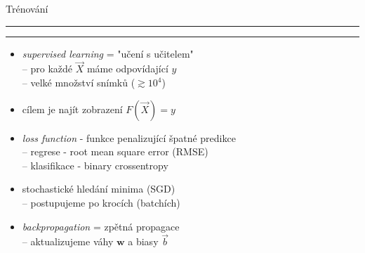 \documentclass[aspectratio=43]{beamer}
\def\vs{\vspace{-2mm}}
\def\lend{\phantom{g}\vspace{1.5mm}\hrule\hrule}
\begin{document}
\begin{frame}{\vs Trénování \lend}
\vspace{1mm}
\begin{itemize}
    \small
    \item<1-4> \textit{supervised learning} = "učení s učitelem"\\ \vspace{1.8mm}
        -- pro každé $\vec{X}$ máme odpovídající $y$\\ \vspace{1.8mm}
        -- velké množství snímků ($\gtrsim 10^4$)\\ \vspace{3.5mm}
    \item<3-4> cílem je najít zobrazení $F(\vec{X}) = y$\\ \vspace{3.5mm}
    \item<4-4> \textit{loss function} - funkce penalizující špatné predikce \\ \vspace{1.8mm}
        -- regrese - root mean square error (RMSE)\\ \vspace{1.8mm}
        -- klasifikace - binary crossentropy\\ \vspace{3.5mm}
    \item<4-4> stochastické hledání minima (SGD)\\ \vspace{1.8mm}
        -- postupujeme po krocích (batchích)\\ \vspace{3.5mm}
    \item<4-4> \textit{backpropagation} = zpětná propagace\\ \vspace{1.8mm}
        -- aktualizujeme váhy $\textbf{w}$ a biasy $\vec{b}$\\ \vspace{4mm}
\end{itemize}
\end{frame}
\end{document}
